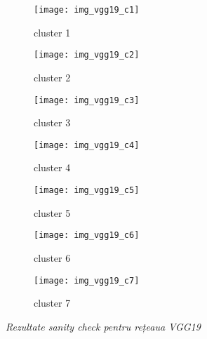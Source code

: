 \begin{figure}[!h]
  \centering
  \begin{subfigure}[t]{0.45\textwidth}
	\caption{cluster 1}    
    \texttt{[image: img\_vgg19\_c1]}
  \end{subfigure}
  \hfill
  \begin{subfigure}[t]{0.45\textwidth}
    \caption{cluster 2}
    \texttt{[image: img\_vgg19\_c2]}
  \end{subfigure}
   \hfill
  \begin{subfigure}[t]{0.45\textwidth}
    \caption{cluster 3}
    \texttt{[image: img\_vgg19\_c3]}
  \end{subfigure}
  \hfill
  \begin{subfigure}[t]{0.45\textwidth}
    \caption{cluster 4}
    \texttt{[image: img\_vgg19\_c4]}
  \end{subfigure}
  \hfill
  \begin{subfigure}[t]{0.45\textwidth}
    \caption{cluster 5}
    \texttt{[image: img\_vgg19\_c5]}
  \end{subfigure}
  \hfill
  \begin{subfigure}[t]{0.45\textwidth}
    \caption{cluster 6}
    \texttt{[image: img\_vgg19\_c6]}
  \end{subfigure}
    \hfill
  \begin{subfigure}[t]{0.45\textwidth}
    \caption{cluster 7}
    \texttt{[image: img\_vgg19\_c7]}
  \end{subfigure}
  \caption[Rezultate sanity check pentru rețeaua VGG19]{\textit{Rezultate sanity check pentru rețeaua VGG19}}
\end{figure}

